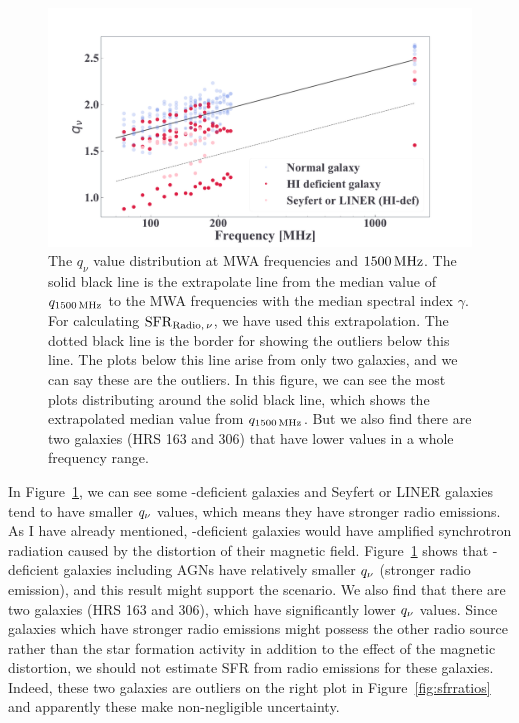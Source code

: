 \begin{figure}[htbp]
	\centering
	\includegraphics[width=\linewidth]{Chapter_6/Figures/Discuss_compareq.pdf}
    \caption[$\qn$ plots for each galaxy with labels]{\label{fig:comparehist_q}
        The $q_{\nu}$ value distribution at MWA frequencies and $1500\,\mathrm{MHz}$.
        The solid black line is the extrapolate line from the median value of $q_{\mathrm{1500\,\mathrm{MHz}}}$ to the MWA frequencies with the median spectral index $\gamma$.
        For calculating $\mathrm{SFR}_{\mathrm{Radio},\,\nu}$, we have used this extrapolation. The dotted black line is the border for showing the outliers below this line.
        The plots below this line arise from only two galaxies, and we can say these are the outliers.
        In this figure, we can see the most plots distributing around the solid black line, which shows the extrapolated median value from $q_{\mathrm{1500\,\mathrm{MHz}}}$.
        But we also find there are two galaxies (HRS 163 and 306) that have lower values in a whole frequency range.
    }
\end{figure}

In Figure~\ref{fig:comparehist_q}, we can see some \nh-deficient galaxies and Seyfert or LINER galaxies tend to have smaller $\qn$ values, which means they have stronger radio emissions.
As I have already mentioned, \nh-deficient galaxies would have amplified synchrotron radiation caused by the distortion of their magnetic field.
Figure~\ref{fig:comparehist_q} shows that \nh-deficient galaxies including AGNs have relatively smaller $\qn$ (stronger radio emission), and this result might support the scenario.
We also find that there are two galaxies (HRS 163 and 306), which have significantly lower $\qn$ values.
Since galaxies which have stronger radio emissions might possess the other radio source rather than the star formation activity in addition to the effect of the magnetic distortion, we should not estimate SFR from radio emissions for these galaxies.
Indeed, these two galaxies are outliers on the right plot in Figure~\ref{fig:sfrratios} and apparently these make non-negligible uncertainty.

